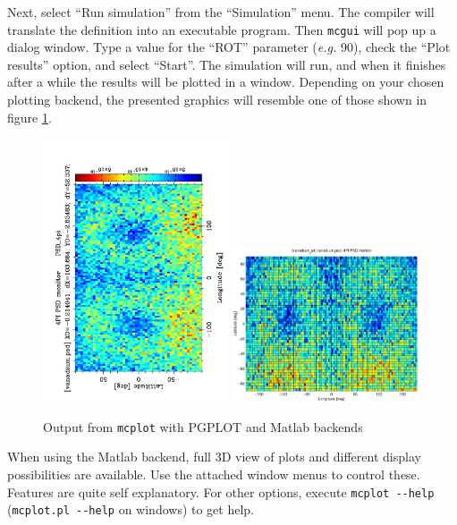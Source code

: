 Next, select ``Run simulation'' from the ``Simulation'' menu.
The \MCS compiler \mcs will translate the definition into an executable program.
Then \texttt{mcgui} will pop up a dialog window.
Type a value for the ``ROT'' parameter ({\em e.g.}
90), check the ``Plot results'' option, and select ``Start''. The
simulation will run, and when it finishes after a while the results will
be plotted in a window. Depending on your chosen plotting backend, the
presented graphics will resemble one of those shown in figure
\ref{fig:mcplot_figs}.
\begin{figure}[htb!]
  \begin{center}
    \includegraphics[angle=-90,width=0.49\textwidth]{figures/mcplot_PGPLOT}
    \includegraphics[width=0.49\textwidth]{figures/mcplot_Matlab}
  \end{center}
\caption{Output from \texttt{mcplot} with PGPLOT and Matlab backends}
\label{fig:mcplot_figs}
\end{figure}
When using the Matlab backend, full 3D view of plots and different
display possibilities are available. Use the attached \MCS window menus to
control these. Features are quite self explanatory. For other options, execute
\verb+mcplot --help+ (\verb+mcplot.pl --help+ on windows) to get help.

